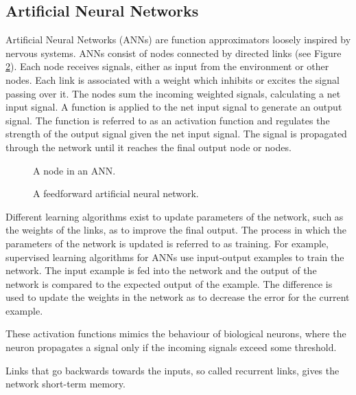 \newpage
\subsection{Artificial Neural Networks}
\newline
Artificial Neural Networks (ANNs) are function approximators loosely inspired by nervous systems.
ANNs consist of nodes connected by directed links (see Figure \ref{feedforward}). Each node receives signals, either as input from
the environment or other nodes. Each link is associated with a weight which inhibits or excites the signal passing
over it. The nodes sum the incoming weighted signals, calculating a net input signal. A function
is applied to the net input signal to generate an output signal. The function is referred to as an activation function
and regulates the strength of the output signal given the net input signal. The signal is propagated through the network
until it reaches the final output node or nodes.


\begin{figure}[htb]
	\centering
	\resizebox{.4\textwidth}{!}{}
	\caption{A node in an ANN.}
	\label{neuron}
\end{figure}


\begin{figure}[htb]
	\centering
	\resizebox{.4\textwidth}{!}{}
	\caption{A feedforward artificial neural network.}
	\label{feedforward}
\end{figure}

\newline
Different learning algorithms exist to update parameters of the network, such as the weights of the
links, as to improve the final output. The process in which the parameters of the network is updated
is referred to as training. For example, supervised learning algorithms for ANNs use input-output examples
to train the network. The input example is fed into the network and the output of the network is compared to
the expected output of the example. The difference is used to update the weights in the network as to decrease
the error for the current example.


These activation functions mimics the behaviour of biological neurons, where the neuron propagates
a signal only if the incoming signals exceed some threshold.


Links that go backwards towards the inputs, so called recurrent links, gives the network short-term memory.

